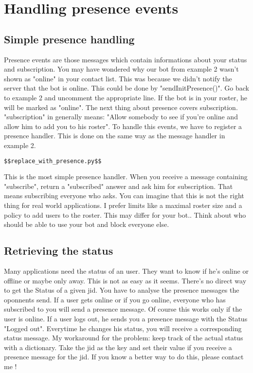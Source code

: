 \section{Handling presence events}

\subsection{Simple presence handling}

Presence events are those messages which contain informations about your status and subscription.
You may have wondered why our bot from example 2 wasn't shown as "online" in your contact list.
This was because we didn't notify the server that the bot is online. This could be done by "sendInitPresence()". Go back to example 2 and uncomment the appropriate line. If the bot is in your roster, he will be marked as "online".
\newline
\newline
The next thing about presence covers subscription. "subscription" in generally means: "Allow somebody to see if you're online and allow him to add you to his roster".
To handle this events, we have to register a presence handler. This is done on the same way as the message handler in example 2.

\begin{verbatim}
$$replace_with_presence.py$$
\end{verbatim}
This is the most simple presence handler. When you receive a message containing "subscribe", return a "subscribed" answer and ask him for subscription. That means subscribing everyone who asks.
You can imagine that this is not the right thing for real world applications. I prefer limits like a maximal roster size and a policy to add users to the roster. This may differ for your bot..
\newline
Think about who should be able to use your bot and block everyone else.
\newpage
\subsection{Retrieving the status}


Many applications need the status of an user. They want to know if he's online or offline or maybe only away.
This is not as easy as it seems. There's no direct way to get the Status of a given jid. You have to analyse the presence messages the oponnents send. If a user gets online or if you go online, everyone who has subscribed to you will send a presence message. Of course this works only if the user is online.
If a user logs out, he sends you a presence message with the Status "Logged out". Everytime he changes his status, you will receive a corresponding status message.
My workaround for the problem: keep track of the actual status with a dictionary. Take the jid as the key
and set their value if you receive a presence message for the jid.
\newline
\newline
If you know a better way to do this, please contact me !


